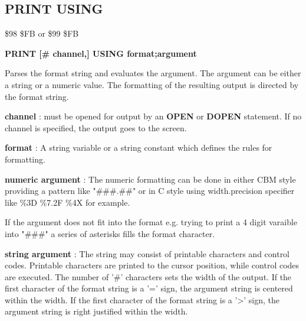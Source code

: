 
\newpage
\subsection{PRINT USING}
\begin{description}[leftmargin=2cm,style=nextline]
\item [Token:] \$98 \$FB or \$99 \$FB
\item [Format:] {\bf PRINT [\# channel,] USING format;argument}
\item [Usage:]  Parses the format string and evaluates the argument.
                The argument can be either a string or a numeric value.
                The formatting of the resulting output is directed
                by the format string.

                {\bf channel} : must be opened for output by
                an {\bf OPEN} or {\bf DOPEN} statement.
                If no channel is specified, the output goes to the screen.

                {\bf format} : A string variable or a string constant
                which defines the rules for formatting.

                {\bf numeric argument} :
                The numeric formatting can be done in either
                CBM style providing a pattern like
                {\ttfamily "\#\#\#.\#\#"}
                or in C style using width.precision specifier like
                {\ttfamily \%3D \%7.2F \%4X } for example.

                If the argument does not fit into the format
                e.g. trying to print a 4 digit varaible into "\#\#\#"
                a series of asterisks fills the format character.

                {\bf string argument} : The string may consist of printable
                characters and control codes. Printable characters
                are printed to the cursor position, while control
                codes are executed.
                The number of '\#' characters sets the width of the output.
                If the first character of the format string
                is a '=' sign, the argument string is centered within
                the width.
                If the first character of the format string
                is a '>' sign, the argument string is right justified within
                the width.


\end{description}
